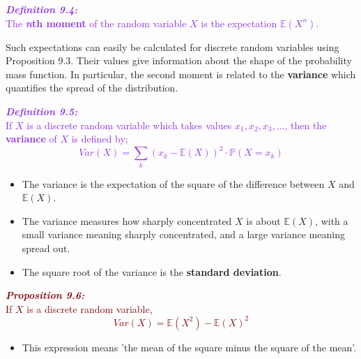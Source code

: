 \documentclass{report}
\newenvironment{cframed}[1][BlueViolet]
  {\begin{tcolorbox}[colframe=#1,colback=white]}
  {\end{tcolorbox}}
\newenvironment{cframedprop}[1][Maroon]
  {\begin{tcolorbox}[colframe=#1,colback=white]}
  {\end{tcolorbox}}
\begin{document}
\begin{cframed}
    \textcolor{BlueViolet}{\textbf{\textit{Definition 9.4:}}\\
    The \textbf{\textit{n}th moment} of the random variable $X$ is the expectation $\mathbb{E}(X^n)$.}
\end{cframed}

Such expectations can easily be calculated for discrete random variables using Proposition 9.3. Their values give information about the shape of the probability mass function. In particular, the second moment is related to the \textbf{variance} which quantifies the spread of the distribution.

\begin{cframed}
    \textcolor{BlueViolet}{\textbf{\textit{Definition 9.5:}}\\
    If $X$ is a discrete random variable which takes values $x_1,x_2,x_3,...$, then the \textbf{variance} of $X$ is defined by;
    \begin{equation}
        Var(X) = \sum_k (x_k - \mathbb{E}(X))^2 \cdot \mathbb{P}(X = x_k)
    \end{equation}}
\end{cframed}

\begin{itemize}
    \item The variance is the expectation of the square of the difference between $X$ and $\mathbb{E}(X)$.
    \item The variance measures how sharply concentrated $X$ is about $\mathbb{E}(X)$, with a small variance meaning sharply concentrated, and a large variance meaning spread out.
    \item The square root of the variance is the \textbf{standard deviation}.
\end{itemize}

\begin{cframedprop}
\textcolor{Maroon}{\textbf{\textit{Proposition 9.6:}}\\
    If $X$ is a discrete random variable, 
    \begin{equation}
        Var(X) = \mathbb{E}(X^2) - \mathbb{E}(X)^2
    \end{equation}}
\end{cframedprop}
\begin{itemize}
    \item This expression means 'the mean of the square minus the square of the mean'.
\end{itemize}
\end{document}
